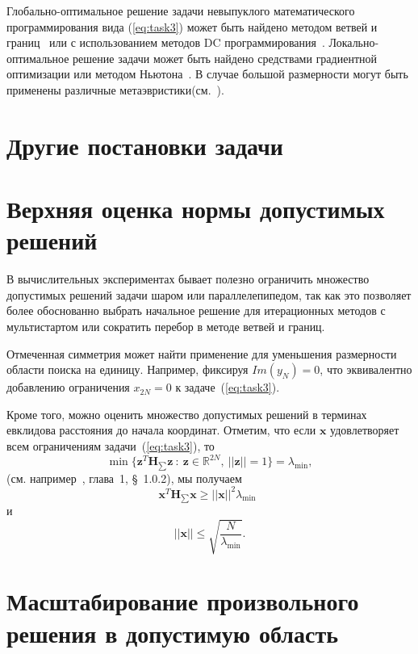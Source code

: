 Глобально-оптимальное решение задачи невыпуклого математического программирования вида (\ref{eq:task3}) может быть найдено методом
ветвей и границ~\cite{horst:global,tawarmalani:global} или с использованием методов DC программирования~\cite{horst:handbook,strekalovsky:global}. Локально-оптимальное решение задачи может быть найдено средствами градиентной оптимизации или методом Ньютона~\cite{himmelblau:nlp}. В случае большой размерности могут быть применены различные метаэвристики(см.~\cite{eberhart:swarm,storn:de}).

\section{Другие постановки задачи}

\section{Верхняя оценка нормы допустимых решений} \label{subsec:top}

В вычислительных экспериментах бывает полезно ограничить множество допустимых решений задачи шаром или параллелепипедом, так как это позволяет более обоснованно выбрать начальное решение для итерационных методов с мультистартом или сократить перебор в методе ветвей и границ.

Отмеченная симметрия может найти применение для уменьшения размерности области поиска на единицу. Например, фиксируя $Im(y_{N})=0$, что эквивалентно добавлению ограничения $x_{2N}=0$ к задаче~(\ref{eq:task3}).

Кроме того, можно оценить множество допустимых решений в терминах евклидова расстояния до начала координат. Отметим, что если $\textbf{x}$ удовлетворяет всем ограничениям задачи~(\ref{eq:task3}), то
$$
\min\{\textbf{z}^T \textbf{H}_{\sum} \textbf{z} \ : \ \textbf{z}\in
\mathbb{R}^{2N}, \ ||\textbf{z}|| =1\} = \lambda_{\min},
$$
(см. например~\cite{horn:matrix}, глава~1, \S~1.0.2), мы получаем
$$
\textbf{x}^T \textbf{H}_{\sum} \textbf{x} \ge ||\textbf{x}||^2
\lambda_{\min}\ \
$$
и
\begin{equation} \label{eqn:bound}
||\textbf{x}||\le \sqrt{\frac{N}{\lambda_{\min}}}.
\end{equation}

\section{Масштабирование произвольного решения в допустимую область} \label{sec:scaling}

